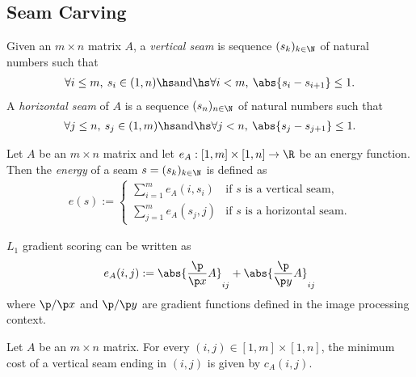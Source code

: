 \documentclass{article}
\begin{document}
\subsection{Seam Carving}

\begin{definition}
	Given an $m\times n$ matrix $A$, a \emph{vertical seam} is sequence $(s_k)_{k\in\N}$
	of natural numbers such that
	\begin{align*}
		\forall i\leq m,\: s_i\in(1,n)\hs\text{and}\hs\forall i<m,\: \abs{s_i - s_{i+1}} \leq 1.
	\end{align*}
	A \emph{horizontal seam} of $A$ is a sequence $(s_n)_{n\in\N}$ of natural numbers
	such that
	\begin{align*}
		\forall j\leq n,\: s_j\in(1,m)\hs\text{and}\hs\forall j<n,\: \abs{s_j - s_{j+1}} \leq 1.
	\end{align*}
\end{definition}

\begin{definition}
	Let $A$ be an $m\times n$ matrix and let $e_A:[1,m]\times[1,n]\to\R$ be an
	energy function. Then the \emph{energy} of a seam $s=(s_k)_{k\in\N}$ is defined as
	\begin{align*}
		e(s) := \begin{cases}
			\sum_{i=1}^m e_A(i,s_i) &\text{if } s \text{ is a vertical seam},\\
			\sum_{j=1}^m e_A(s_j,j) &\text{if } s \text{ is a horizontal seam}.
		\end{cases}
	\end{align*}
\end{definition}

\begin{definition}
	$L_1$ gradient scoring can be written as
	\begin{align*}
		e_A(i,j) := \abs{\frac{\p}{\p x} A}_{ij} + \abs{\frac{\p}{\p y} A}_{ij}
	\end{align*}
	where $\p/\p x$ and $\p/\p y$ are gradient functions defined in the image
	processing context.
\end{definition}

\begin{definition}
	Let $A$ be an $m\times n$ matrix. 
	For every $(i,j)\in[1,m]\times[1,n]$, the minimum cost of a vertical seam 
	ending in $(i,j)$ is given by $c_A(i,j)$.
\end{definition}
\end{document}
